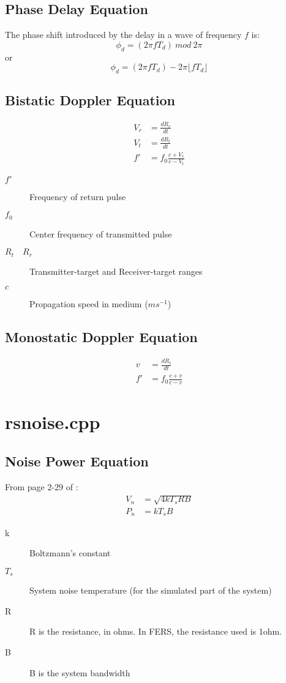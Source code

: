 \documentclass[a4paper,10pt]{article}
\begin{document}
\subsection{Phase Delay Equation}\label{phase}
The phase shift introduced by the delay in a wave of frequency $f$ is:
\begin{equation}
\phi_d = (2\pi f T_d)~{mod}~2\pi
\end{equation}
or
\begin{equation}
\phi_d = (2\pi f T_d) - 2\pi \lfloor f T_d \rfloor
\end{equation}

\subsection{Bistatic Doppler Equation}
\begin{align}
V_r &= \frac{dR_r}{dt}\\
V_t &= \frac{dR_t}{dt}\\
f' &= f_0 \frac{c+V_r}{c-V_t}
\end{align}
\begin{description}
 \item[$f'$] Frequency of return pulse
\item[$f_0$] Center frequency of transmitted pulse
\item[$R_t \quad R_r$] Transmitter-target and Receiver-target ranges
\item[$c$] Propagation speed in medium ($ms^{-1}$)
\end{description}

\subsection{Monostatic Doppler Equation}
\begin{align}
v &= \frac{dR_t}{dt} \\
f' &= f_0 \frac{c+v}{c-v}
\end{align}

\section {rsnoise.cpp}

\subsection{Noise Power Equation}
From page 2-29 of \cite{skolnik70}:
\begin{align}
V_n &= \sqrt{4k T_s RB} \\
P_n &= k T_s B
\end{align}
\begin{description}
 \item[k] Boltzmann's constant
\item[$T_s$] System noise temperature (for the simulated part of the system)
\item[R] R is the resistance, in ohms. In FERS, the resistance used is 1ohm.
\item[B] B is the system bandwidth
\end{description}
\end{document}
